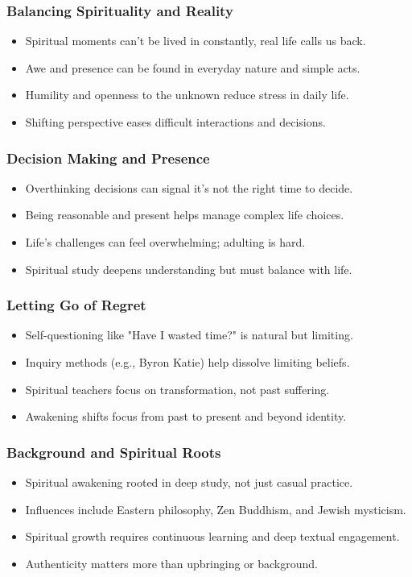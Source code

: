 \begin{frame}[fragile]\frametitle{Balancing Spirituality and Reality}
  \begin{itemize}
    \item Spiritual moments can’t be lived in constantly, real life calls us back.
    \item Awe and presence can be found in everyday nature and simple acts.
    \item Humility and openness to the unknown reduce stress in daily life.
    \item Shifting perspective eases difficult interactions and decisions.
  \end{itemize}
\end{frame}

\begin{frame}[fragile]\frametitle{Decision Making and Presence}
  \begin{itemize}
    \item Overthinking decisions can signal it’s not the right time to decide.
    \item Being reasonable and present helps manage complex life choices.
    \item Life’s challenges can feel overwhelming; adulting is hard.
    \item Spiritual study deepens understanding but must balance with life.
  \end{itemize}
\end{frame}

\begin{frame}[fragile]\frametitle{Letting Go of Regret}
  \begin{itemize}
    \item Self-questioning like "Have I wasted time?" is natural but limiting.
    \item Inquiry methods (e.g., Byron Katie) help dissolve limiting beliefs.
    \item Spiritual teachers focus on transformation, not past suffering.
    \item Awakening shifts focus from past to present and beyond identity.
  \end{itemize}
\end{frame}

\begin{frame}[fragile]\frametitle{Background and Spiritual Roots}
  \begin{itemize}
    \item Spiritual awakening rooted in deep study, not just casual practice.
    \item Influences include Eastern philosophy, Zen Buddhism, and Jewish mysticism.
    \item Spiritual growth requires continuous learning and deep textual engagement.
    \item Authenticity matters more than upbringing or background.
  \end{itemize}
\end{frame}

